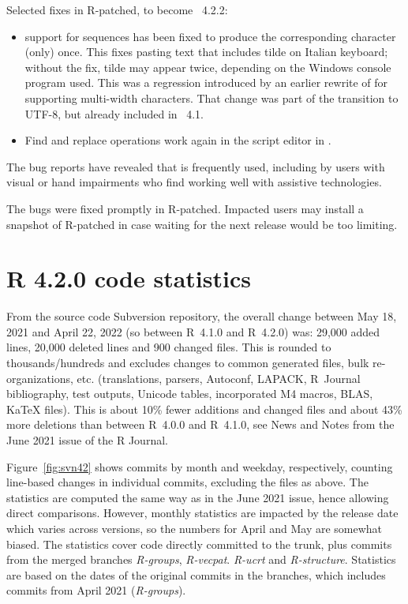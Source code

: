 \begin{itemize}
\end{itemize}

Selected fixes in R-patched, to become \R{}~4.2.2:

\begin{itemize}

 \item{}  support for  sequences has been fixed
  to produce the corresponding character (only) once.  This fixes pasting
  text that includes tilde on Italian keyboard; without the fix, tilde may
  appear twice, depending on the Windows console program used.  This was a
  regression introduced by an earlier rewrite of  for
  supporting multi-width characters.  That change was part of the transition
  to UTF-8, but already included in \R{}~4.1.

 \item{} Find and replace operations work again in the script editor in
  .

\end{itemize}

The bug reports have revealed that  is frequently used,
including by users with visual or hand impairments
who find  working well with assistive
technologies.

The bugs were fixed promptly in R-patched. Impacted users may install a
snapshot of R-patched in case waiting for the next release would be too
limiting.


\newpage
\section{R 4.2.0 code statistics}

From the source code Subversion repository, the overall change between May
18, 2021 and April 22, 2022 (so between R~4.1.0 and R~4.2.0) was:
29,000 added lines, 20,000 deleted lines and 900 changed files.  This
is rounded to thousands/hundreds and excludes changes to common generated
files, bulk re-organizations, etc.  (translations, parsers, Autoconf,
LAPACK, R~Journal bibliography, test outputs, Unicode tables, incorporated
M4 macros, BLAS, KaTeX files). This is about 10\% fewer additions and
changed files and about 43\% more deletions than between R~4.0.0 and
R~4.1.0, see News and Notes from the June 2021 issue of the R Journal.

Figure~\ref{fig:svn42} shows commits by month and weekday, respectively,
counting line-based changes in individual commits, excluding the files as
above.  The statistics are computed the same way as in the June 2021 issue,
hence allowing direct comparisons. However, monthly statistics are impacted by
the release date which varies across versions, so the numbers
for April and May are somewhat biased.  The statistics cover code directly committed to the
trunk, plus commits from the merged branches \emph{R-groups},
\emph{R-vecpat}. \emph{R-ucrt} and \emph{R-structure}. Statistics are based
on the dates of the original commits in the branches, which includes commits
from April 2021 (\emph{R-groups}).

